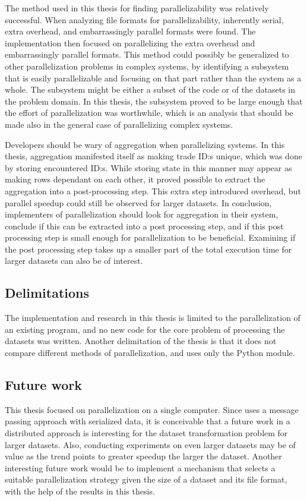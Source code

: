 The method used in this thesis for finding parallelizability was relatively successful. When analyzing file formats for parallelizability,
inherently serial, extra overhead, and embarrassingly parallel formats were found. The implementation then focused on parallelizing
the extra overhead and embarrassingly parallel formats. This method could possibly be generalized to other parallelization problems
in complex systems, by identifying a subsystem that is easily parallelizable and focusing on that part rather than the system as a whole.
The subsystem might be either a subset of the code or of the datasets in the problem domain. In this thesis, the subsystem proved to be
large enough that the effort of parallelization was worthwhile, which is an analysis that should be made also in the general case of
parallelizing complex systems.

Developers should be wary of aggregation when parallelizing systems. In this thesis, aggregation manifested itself as making trade ID:s unique,
which was done by storing encountered ID:s. While storing state in this manner may appear as making rows dependant on each other, it proved
possible to extract the aggregation into a post-processing step. This extra step introduced overhead, but parallel speedup could still be 
observed for larger datasets. In conclusion, implementers of parallelization should look for aggregation in their system, conclude if this
can be extracted into a post processing step, and if this post processing step is small enough for parallelization to be beneficial. Examining
if the post processing step takes up a smaller part of the total execution time for larger datasets can also be of interest.

\subsection{Delimitations}
The implementation and research in this thesis is limited to the parallelization of an existing program, and no new code for the core problem
of processing the datasets was written. Another delimitation of the thesis is that it does not compare different methods of parallelization,
and uses only the Python  module.

\subsection{Future work}
This thesis focused on parallelization on a single computer. Since  uses a message passing approach with serialized data,
it is conceivable that a future work in a distributed approach is interesting for the dataset transformation problem for larger datasets. Also,
conducting experiments on even larger datasets may be of value as the trend points to greater speedup the larger the dataset. Another interesting
future work would be to implement a mechanism that selects a suitable parallelization strategy given the size of a dataset and its file format, with
the help of the results in this thesis.


